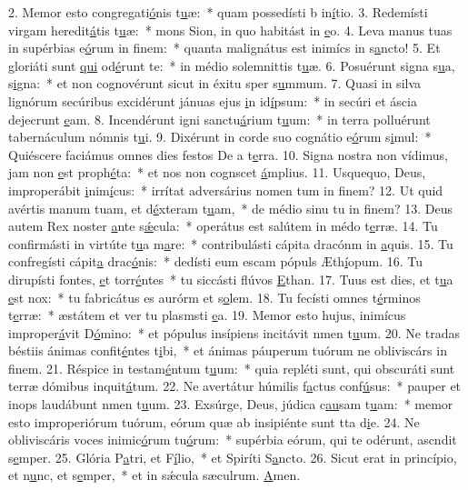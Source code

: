 2. Memor esto congregati\uline{ó}nis t\uline{u}æ:~* quam possedísti b in\uline{í}tio.
3. Redemísti virgam heredit\uline{á}tis t\uline{u}æ:~* mons Sion, in quo habitást in \uline{e}o.
4. Leva manus tuas in supérbias e\uline{ó}rum in f\uline{i}nem:~* quanta malignátus est inimícs in s\uline{a}ncto!
5. Et gloriáti sunt \uline{qui} od\uline{é}runt te:~* in médio solemnittis t\uline{u}æ.
6. Posuérunt signa s\uline{u}a, s\uline{i}gna:~* et non cognovérunt sicut in éxitu sper s\uline{u}mmum.
7. Quasi in silva lignórum secúribus excidérunt jánuas ejus \uline{i}n id\uline{í}psum:~* in secúri et áscia dejecrunt \uline{e}am.
8. Incendérunt igni sanctu\uline{á}rium t\uline{u}um:~* in terra polluérunt tabernáculum nómnis t\uline{u}i.
9. Dixérunt in corde suo cognátio e\uline{ó}rum s\uline{i}mul:~* Quiéscere faciámus omnes dies festos De a t\uline{e}rra.
10. Signa nostra non vídimus, jam non \uline{e}st proph\uline{é}ta:~* et nos non cognscet \uline{á}mplius.
11. Usquequo, Deus, improperábit \uline{i}nim\uline{í}cus:~* irrítat adversárius nomen tum in f\uline{i}nem?
12. Ut quid avértis manum tuam, et d\uline{é}xteram t\uline{u}am,~* de médio sinu tu in f\uline{i}nem?
13. Deus autem Rex noster \uline{a}nte s\uline{ǽ}cula:~* operátus est salútem in médo t\uline{e}rræ.
14. Tu confirmásti in virtúte t\uline{u}a m\uline{a}re:~* contribulásti cápita dracónm in \uline{a}quis.
15. Tu confregísti cápit\uline{a} drac\uline{ó}nis:~* dedísti eum escam pópuls Æth\uline{í}opum.
16. Tu dirupísti fontes, \uline{e}t torr\uline{é}ntes~* tu siccásti flúvos \uline{E}than.
17. Tuus est dies, et t\uline{u}a \uline{e}st nox:~* tu fabricátus es aurórm et s\uline{o}lem.
18. Tu fecísti omnes t\uline{é}rminos t\uline{e}rræ:~* æstátem et ver tu plasmsti \uline{e}a.
19. Memor esto hujus, inimícus improper\uline{á}vit D\uline{ó}mino:~* et pópulus insípiens incitávit nmen t\uline{u}um.
20. Ne tradas béstiis ánimas confit\uline{é}ntes t\uline{i}bi,~* et ánimas páuperum tuórum ne obliviscárs in f\uline{i}nem.
21. Réspice in testam\uline{é}ntum t\uline{u}um:~* quia repléti sunt, qui obscuráti sunt terræ dómibus inquit\uline{á}tum.
22. Ne avertátur húmilis f\uline{a}ctus conf\uline{ú}sus:~* pauper et inops laudábunt nmen t\uline{u}um.
23. Exsúrge, Deus, júdica c\uline{au}sam t\uline{u}am:~* memor esto improperiórum tuórum, eórum quæ ab insipiénte sunt tta d\uline{i}e.
24. Ne obliviscáris voces inimic\uline{ó}rum tu\uline{ó}rum:~* supérbia eórum, qui te odérunt, ascndit s\uline{e}mper.
25. Glória P\uline{a}tri, et F\uline{í}lio,~* et Spiríti S\uline{a}ncto.
26. Sicut erat in princípio, et n\uline{u}nc, et s\uline{e}mper,~* et in sǽcula sæculrum. \uline{A}men.
